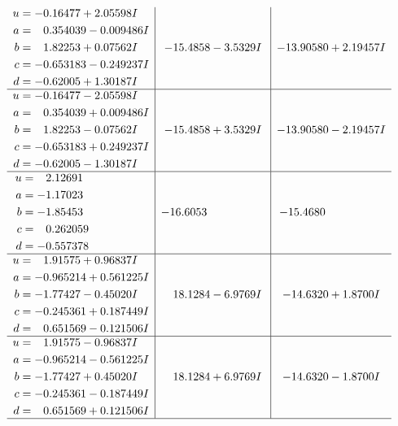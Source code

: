 \documentclass[1p]{elsarticle_modified}
\theoremstyle{definition}
\begin{document}
$$\begin{array}{c|c|c}
\begin{aligned}
u &= -0.16477 + 2.05598 I \\
a &= \phantom{-}0.354039 - 0.009486 I \\
b &= \phantom{-}1.82253 + 0.07562 I \\
c &= -0.653183 - 0.249237 I \\
d &= -0.62005 + 1.30187 I\end{aligned}
 & -15.4858 - 3.5329 I & -13.90580 + 2.19457 I \\ \hline\begin{aligned}
u &= -0.16477 - 2.05598 I \\
a &= \phantom{-}0.354039 + 0.009486 I \\
b &= \phantom{-}1.82253 - 0.07562 I \\
c &= -0.653183 + 0.249237 I \\
d &= -0.62005 - 1.30187 I\end{aligned}
 & -15.4858 + 3.5329 I & -13.90580 - 2.19457 I \\ \hline\begin{aligned}
u &= \phantom{-}2.12691\phantom{ +0.000000I} \\
a &= -1.17023\phantom{ +0.000000I} \\
b &= -1.85453\phantom{ +0.000000I} \\
c &= \phantom{-}0.262059\phantom{ +0.000000I} \\
d &= -0.557378\phantom{ +0.000000I}\end{aligned}
 & -16.6053\phantom{ +0.000000I} & -15.4680\phantom{ +0.000000I} \\ \hline\begin{aligned}
u &= \phantom{-}1.91575 + 0.96837 I \\
a &= -0.965214 + 0.561225 I \\
b &= -1.77427 - 0.45020 I \\
c &= -0.245361 + 0.187449 I \\
d &= \phantom{-}0.651569 - 0.121506 I\end{aligned}
 & \phantom{-}18.1284 - 6.9769 I & -14.6320 + 1.8700 I \\ \hline\begin{aligned}
u &= \phantom{-}1.91575 - 0.96837 I \\
a &= -0.965214 - 0.561225 I \\
b &= -1.77427 + 0.45020 I \\
c &= -0.245361 - 0.187449 I \\
d &= \phantom{-}0.651569 + 0.121506 I\end{aligned}
 & \phantom{-}18.1284 + 6.9769 I & -14.6320 - 1.8700 I\\
 \hline 
 \end{array}$$\newpage\newpage\renewcommand{\arraystretch}{1}
\end{document}

